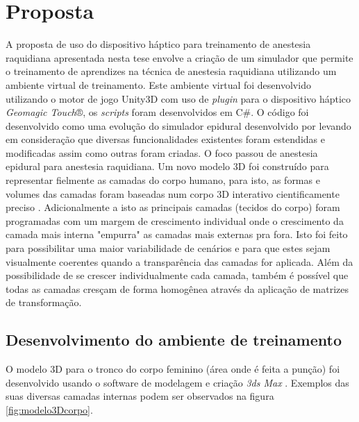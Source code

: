 \chapter{Proposta} \label{cap:cap4}

A proposta de uso do dispositivo háptico para treinamento de anestesia raquidiana apresentada nesta tese envolve a criação de um simulador que permite o treinamento de aprendizes na técnica de anestesia raquidiana utilizando um ambiente virtual de treinamento.
Este ambiente virtual foi desenvolvido utilizando o motor de jogo Unity3D \cite{UnityTechnologies2020} com uso de \textit{plugin} para o dispositivo háptico \textit{Geomagic Touch}®, os \textit{scripts} foram desenvolvidos em C\#. O código foi desenvolvido como uma evolução do simulador epidural desenvolvido por \textcite{Brazil2017} levando em consideração que diversas funcionalidades existentes foram estendidas e modificadas assim como outras foram criadas. O foco passou de anestesia epidural para anestesia raquidiana. Um novo modelo 3D foi construído para representar fielmente as camadas do corpo humano, para isto, as formas e volumes das camadas foram baseadas num corpo 3D interativo cientificamente preciso \cite{BioDigitalInc2019}. Adicionalmente a isto as principais camadas (tecidos do corpo) foram programadas com um margem de crescimento individual onde o crescimento da camada mais interna "empurra" as camadas mais externas pra fora. Isto foi feito para possibilitar uma maior variabilidade de cenários e para que estes sejam visualmente coerentes quando a transparência das camadas for aplicada. Além da possibilidade de se crescer individualmente cada camada, também é possível que todas as camadas cresçam de forma homogênea através da aplicação de matrizes de transformação. 

\section {Desenvolvimento do ambiente de treinamento} 

O modelo 3D para o tronco do corpo feminino (área onde é feita a punção) foi desenvolvido usando o software de modelagem e criação \textit{3ds Max} \cite{Autodesk}. Exemplos das suas diversas camadas internas podem ser observados na figura \ref{fig:modelo3Dcorpo}. 

